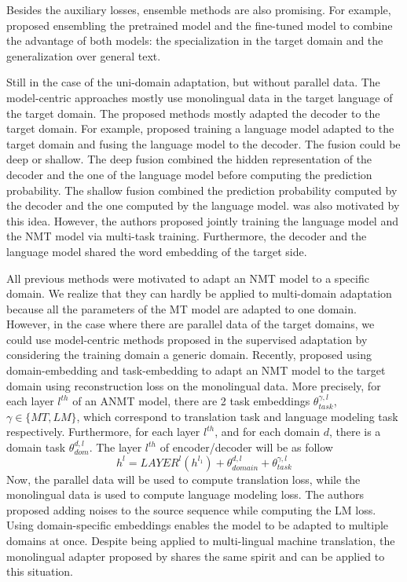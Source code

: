 Besides the auxiliary losses, ensemble methods are also promising. For example, \citet{Freitag16fast} proposed ensembling the pretrained model and the fine-tuned model to combine the advantage of both models: the specialization in the target domain and the generalization over general text.

Still in the case of the uni-domain adaptation, but without parallel data. The model-centric approaches mostly use monolingual data in the target language of the target domain. The proposed methods mostly adapted the decoder to the target domain. For example, \citet{Gulcehre16monolingual} proposed training a language model adapted to the target domain and fusing the language model to the decoder. The fusion could be deep or shallow. The deep fusion combined the hidden representation of the decoder and the one of the language model before computing the prediction probability. The shallow fusion combined the prediction probability computed by the decoder and the one computed by the language model. \citet{Domhan17using} was also motivated by this idea. However, the authors proposed jointly training the language model and the NMT model via multi-task training. Furthermore, the decoder and the language model shared the word embedding of the target side.

All previous methods were motivated to adapt an NMT model to a specific domain. We realize that they can hardly be applied to multi-domain adaptation because all the parameters of the MT model are adapted to one domain. However, in the case where there are parallel data of the target domains, we could use model-centric methods proposed in the supervised adaptation by considering the training domain a generic domain. Recently, \citet{Dou19unsupervised} proposed using domain-embedding and task-embedding to adapt an NMT model to the target domain using reconstruction loss on the monolingual data. More precisely, for each layer $l^{th}$ of an ANMT model, there are 2 task embeddings $\theta_{task}^{\gamma,l}$, $\gamma \in \{ MT, LM \}$, which correspond to translation task and language modeling task respectively. Furthermore, for each layer $l^{th}$, and for each domain $d$, there is a domain task $\theta^{d,l}_{dom}$. The layer $l^{th}$ of encoder/decoder will be as follow
\begin{equation}
h^{l} = LAYER^l(h^{l_1}) + \theta^{d,l}_{domain} + \theta_{task}^{\gamma,l}
\end{equation}
Now, the parallel data will be used to compute translation loss, while the monolingual data is used to compute language modeling loss. The authors proposed adding noises to the source sequence while computing the LM loss. Using domain-specific embeddings enables the model to be adapted to multiple domains at once. Despite being applied to multi-lingual machine translation, the monolingual adapter proposed by \citet{Philip20monolingual} shares the same spirit and can be applied to this situation.
